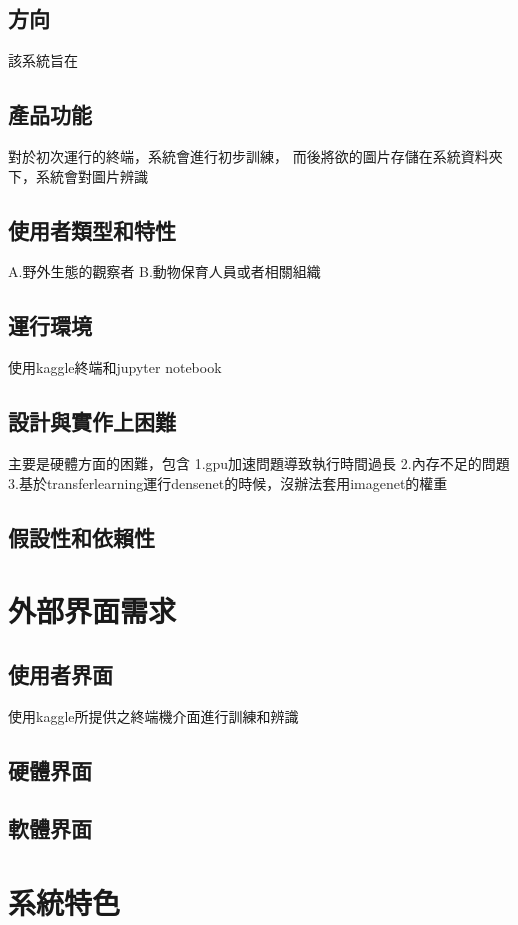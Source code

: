 \documentclass{scrreprt}
\begin{document}
\begin{CJK}{UTF8}{}
\section{方向}
該系統旨在

\section{產品功能}
對於初次運行的終端，系統會進行初步訓練，
而後將欲的圖片存儲在系統資料夾下，系統會對圖片辨識

\section{使用者類型和特性}
A.野外生態的觀察者
B.動物保育人員或者相關組織


\section{運行環境}
使用kaggle終端和jupyter notebook

\section{設計與實作上困難}
主要是硬體方面的困難，包含
1.gpu加速問題導致執行時間過長
2.內存不足的問題
3.基於transferlearning運行densenet的時候，沒辦法套用imagenet的權重

\section{假設性和依賴性}


\chapter{外部界面需求}

\section{使用者界面}
使用kaggle所提供之終端機介面進行訓練和辨識
\section{硬體界面}

\section{軟體界面}

\chapter{系統特色}

\end{CJK}
\end{document}
